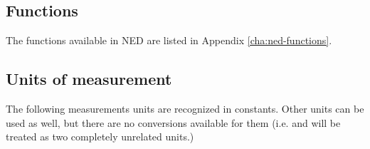 \subsection{Functions}

The functions available in NED are listed in Appendix
\ref{cha:ned-functions}.

\subsection{Units of measurement}
\label{ch-ned-ref:sec:units}

The following measurements units are recognized in constants. Other units can
be used as well, but there are no conversions available for them (i.e.
 and  will be treated as two completely unrelated
units.)

